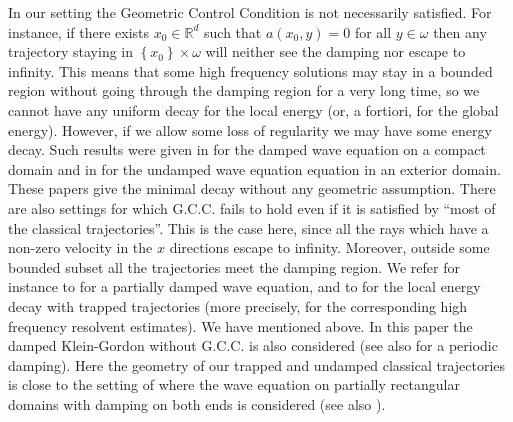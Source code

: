 \documentclass[10pt, a4paper,reqno]{amsart}
\theoremstyle{plain}
\theoremstyle{definition}
\theoremstyle{remark}
\begin{document}
In our setting the Geometric Control Condition is not necessarily satisfied. For instance, if there exists $x_0 \in {\mathbb{R}}^d$ such that $a(x_0,y) = 0$ for all $y \in {\omega}$ then any trajectory staying in ${\left\{ {x_0} \right\}} \times {\omega}$ will neither see the damping nor escape to infinity. This means that some high frequency solutions may stay in a bounded region without going through the damping region for a very long time, so we cannot have any uniform decay for the local energy (or, a fortiori, for the global energy). However, if we allow some loss of regularity we may have some energy decay. Such results were given in \cite{lebeau96, lebeaur97} for the damped wave equation on a compact domain and in \cite{burq98} for the undamped wave equation equation in an exterior domain. These papers give the minimal decay without any geometric assumption. There are also settings for which G.C.C. fails to hold even if it is satisfied by ``most of the classical trajectories''. This is the case here, 
since all the 
rays which have a non-zero velocity in the $x$ directions escape to infinity. Moreover, outside some bounded subset all the trajectories meet the damping region. We refer for instance to \cite{schenck11,anantharamanl,leautaudl} for a partially damped wave equation, and to \cite{nonnenmacherz09} for the local energy decay with trapped trajectories (more precisely, for the corresponding high frequency resolvent estimates). We have mentioned \cite{BurqJo} above. In this paper the damped Klein-Gordon without G.C.C. is also considered (see also \cite{Wunsch} for a periodic damping). Here the geometry of our trapped and undamped classical trajectories is close to the setting of \cite{Burq-Hi-07} where the wave equation on partially rectangular domains with damping on both ends is considered (see also \cite{Nishiyama-09}).\\
\end{document}
